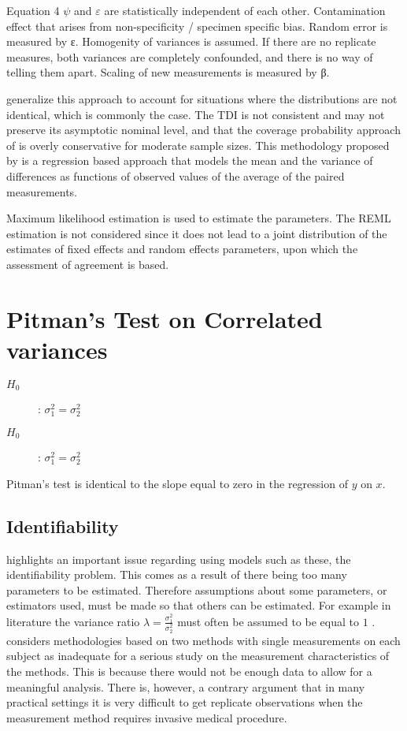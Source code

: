 \documentclass[Main.tex]{subfiles}
\begin{document}
Equation 4 
$\psi$  and $\varepsilon$ are statistically independent of each other.
Contamination effect that arises from non-specificity /  specimen specific bias.
Random error is measured by ε. Homogenity of variances is assumed.
If there are no replicate measures,  both variances are completely confounded, and there is no way of telling them apart.
Scaling of new measurements is measured by β.


\citet{pkcng} generalize this approach to account for situations
where the distributions are not identical, which is commonly the
case. The TDI is not consistent and may not preserve its
asymptotic nominal level, and that the coverage probability
approach of \citet{lin2002} is overly conservative for moderate
sample sizes. This methodology proposed by \citet{pkcng} is a
regression based approach that models the mean and the variance of
differences as functions of observed values of the average of the
paired measurements.

Maximum likelihood estimation is used to estimate the parameters. The REML estimation is not considered since it does not lead to a joint distribution of the estimates of fixed effects and random effects parameters, upon which the assessment of agreement is based.


\section*{Pitman's Test on Correlated variances}
\begin{description}
	\item[$H_0$] : $\sigma^2_1 = \sigma^2_2$
	\item[$H_0$] : $\sigma^2_1 = \sigma^2_2$
\end{description}


Pitman's test is identical to the slope equal to zero in the regression of $y$ on $x$.

\subsection{Identifiability}
\citet{DunnSEME} highlights an important issue regarding using
models such as these, the identifiability problem. This comes as a
result of there being too many parameters to be estimated.
Therefore assumptions about some parameters, or estimators used,
must be made so that others can be estimated. For example in literature the variance
ratio $\lambda=\frac{\sigma^{2}_{1}}{\sigma^{2}_{2}}$
must often be assumed to be equal to $1$ \citep{linnet98}.\citet{DunnSEME} considers methodologies based on two methods with single measurements on each subject as inadequate for a serious
study on the measurement characteristics of the methods. This is
because there would not be enough data to allow for a meaningful
analysis. There is, however, a contrary argument that in many
practical settings it is very difficult to get replicate
observations when the measurement method requires invasive medical
procedure.
\end{document}
